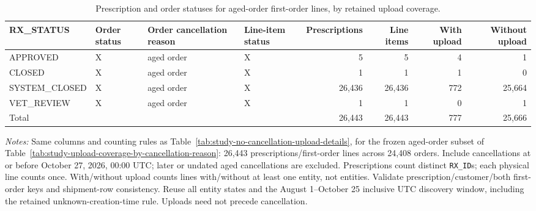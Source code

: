 \begin{table}[!htbp]
\centering
\caption{Prescription and order statuses for aged-order first-order lines, by retained upload coverage.}
\label{tab:study-aged-order-upload-coverage}
\small
\setlength{\tabcolsep}{6pt}
\begin{tabular}{llllrrrr}
\toprule
RX\_STATUS & Order status & Order cancellation reason & Line-item status & Prescriptions & Line items & With upload & Without upload \\
\midrule
\rowcolor{yellow!35}
APPROVED & X & aged order & X & 5 & 5 & 4 & 1 \\
\rowcolor{yellow!35}
CLOSED & X & aged order & X & 1 & 1 & 1 & 0 \\
\rowcolor{yellow!35}
SYSTEM\_CLOSED & X & aged order & X & 26,436 & 26,436 & 772 & 25,664 \\
\rowcolor{yellow!35}
VET\_REVIEW & X & aged order & X & 1 & 1 & 0 & 1 \\
\midrule
\multicolumn{4}{l}{Total} & 26,443 & 26,443 & 777 & 25,666 \\
\bottomrule
\end{tabular}
\begin{minipage}{\linewidth}
\footnotesize
\textit{Notes:} Same columns and counting rules as Table~\ref{tab:study-no-cancellation-upload-details},
for the frozen aged-order subset of Table~\ref{tab:study-upload-coverage-by-cancellation-reason}:
26,443 prescriptions/first-order lines across 24,408 orders. Include cancellations
at or before October 27, 2026, 00:00 UTC; later or undated aged cancellations are excluded.
Prescriptions count distinct \texttt{RX\_ID}s; each physical line counts once.
With/without upload counts lines with/without at least one entity, not entities.
Validate prescription/customer/both first-order keys and shipment-row consistency.
Reuse all entity states and the August 1--October 25 inclusive UTC discovery window,
including the retained unknown-creation-time rule. Uploads need not precede cancellation.
\end{minipage}
\end{table}